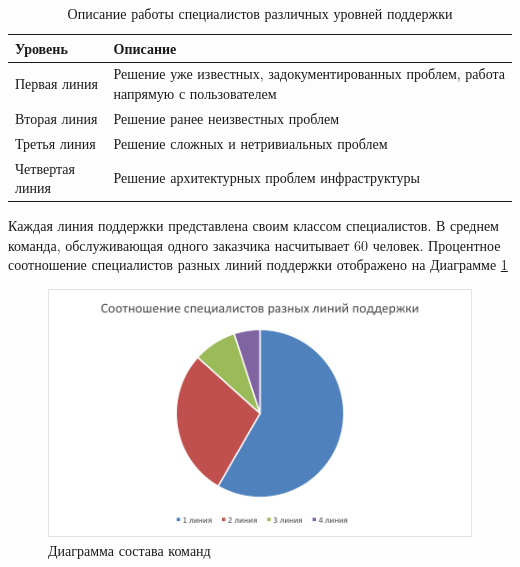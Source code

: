 \begin{table} [htbp]
  \centering
  \parbox{15cm}{\caption{Описание работы специалистов различных уровней поддержки}\label{TSSDescription}}
  \begin{tabular}{| p{7cm} | p{7cm} |}
    \hline
Уровень & Описание \\
  \hline
    

Первая линия	& Решение уже известных, задокументированных проблем, работа напрямую с пользователем \\
  \hline

Вторая линия  & Решение ранее неизвестных проблем \\
  \hline

Третья линия & Решение сложных и нетривиальных проблем \\
  \hline

Четвертая линия  & Решение архитектурных проблем инфраструктуры \\

  \hline
  
  \end{tabular}
\end{table}


Каждая линия поддержки представлена своим классом специалистов. В среднем команда, обслуживающая одного заказчика насчитывает 60 человек. Процентное соотношение специалистов разных линий поддержки отображено на Диаграмме \ref{img:ITSMTeamComposition}

\begin{figure} [h] 
  \center
  \includegraphics [scale=0.7] {ITSMTeamComposition}
  \caption{Диаграмма состава команд} 
  \label{img:ITSMTeamComposition}  
\end{figure}

